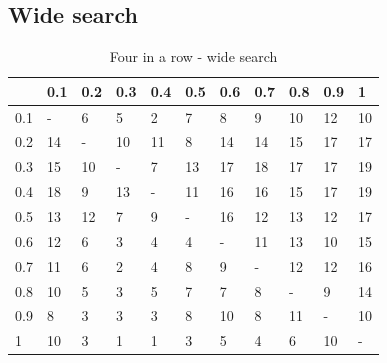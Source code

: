 \documentclass[
11pt, %
english, %
singlespacing, %
headsepline, %
]{MastersDoctoralThesis} %
\begin{document}
\begin{appendices}
\subsection{Wide search}
\begin{table}[H]
	\centering
	\begin{tabular}{|l||l|l|l|l|l|l|l|l|l|l|}
		\hline
		& 0.1 & 0.2 & 0.3 & 0.4 & 0.5 & 0.6 & 0.7 & 0.8 & 0.9 & 1  \\ \hline\hline
		0.1 & -   & 6   & 5   & 2   & 7   & 8   & 9   & 10  & 12  & 10 \\ \hline
		0.2 & 14  & -   & 10  & 11  & 8   & 14  & 14  & 15  & 17  & 17 \\ \hline
		0.3 & 15  & 10  & -   & 7   & 13  & 17  & 18  & 17  & 17  & 19 \\ \hline
		0.4 & 18  & 9   & 13  & -   & 11  & 16  & 16  & 15  & 17  & 19 \\ \hline
		0.5 & 13  & 12  & 7   & 9   & -   & 16  & 12  & 13  & 12  & 17 \\ \hline
		0.6 & 12  & 6   & 3   & 4   & 4   & -   & 11  & 13  & 10  & 15 \\ \hline
		0.7 & 11  & 6   & 2   & 4   & 8   & 9   & -   & 12  & 12  & 16 \\ \hline
		0.8 & 10  & 5   & 3   & 5   & 7   & 7   & 8   & -   & 9   & 14 \\ \hline
		0.9 & 8   & 3   & 3   & 3   & 8   & 10  & 8   & 11  & -   & 10 \\ \hline
		1   & 10  & 3   & 1   & 1   & 3   & 5   & 4   & 6   & 10  & -  \\ \hline
	\end{tabular}
	\caption{Four in a row - wide search}
	\label{table:fourinarow-wide}
\end{table}



\end{appendices}
\end{document}
